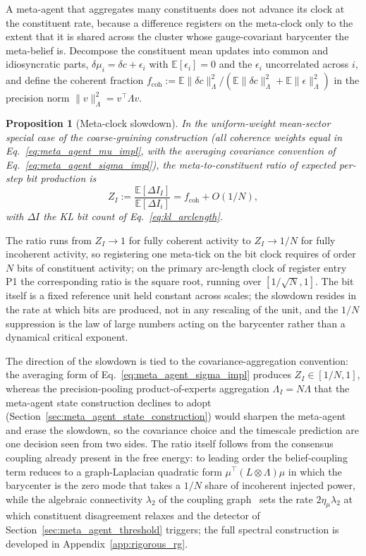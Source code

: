 \documentclass[11pt]{article}
\newtheorem{proposition}{Proposition}
\begin{document}
A meta-agent that aggregates many constituents does not advance its clock at the constituent rate, because a difference registers on the meta-clock only to the extent that it is shared across the cluster whose gauge-covariant barycenter the meta-belief is. Decompose the constituent mean updates into common and idiosyncratic parts, $\delta\mu_i = \delta c + \epsilon_i$ with $\mathbb{E}[\epsilon_i] = 0$ and the $\epsilon_i$ uncorrelated across $i$, and define the coherent fraction $f_{\mathrm{coh}} := \mathbb{E}\|\delta c\|^2_\Lambda / (\mathbb{E}\|\delta c\|^2_\Lambda + \mathbb{E}\|\epsilon\|^2_\Lambda)$ in the precision norm $\|v\|^2_\Lambda = v^\top \Lambda v$.
\begin{proposition}[Meta-clock slowdown]\label{prop:meta_clock_slowdown}
In the uniform-weight mean-sector special case of the coarse-graining construction (all coherence weights equal in Eq.~\eqref{eq:meta_agent_mu_impl}, with the averaging covariance convention of Eq.~\eqref{eq:meta_agent_sigma_impl}), the meta-to-constituent ratio of expected per-step bit production is
\begin{equation}
Z_I := \frac{\mathbb{E}[\Delta I_I]}{\mathbb{E}[\Delta I_i]} = f_{\mathrm{coh}} + O(1/N),
\label{eq:bit_production_ratio}
\end{equation}
with $\Delta I$ the KL bit count of Eq.~\eqref{eq:kl_arclength}.
\end{proposition}
The ratio runs from $Z_I \to 1$ for fully coherent activity to $Z_I \to 1/N$ for fully incoherent activity, so registering one meta-tick on the bit clock requires of order $N$ bits of constituent activity; on the primary arc-length clock of register entry P1 the corresponding ratio is the square root, running over $[1/\sqrt{N}, 1]$. The bit itself is a fixed reference unit held constant across scales; the slowdown resides in the rate at which bits are produced, not in any rescaling of the unit, and the $1/N$ suppression is the law of large numbers acting on the barycenter rather than a dynamical critical exponent.

The direction of the slowdown is tied to the covariance-aggregation convention: the averaging form of Eq.~\eqref{eq:meta_agent_sigma_impl} produces $Z_I \in [1/N, 1]$, whereas the precision-pooling product-of-experts aggregation $\Lambda_I = N\Lambda$ that the meta-agent state construction declines to adopt (Section~\ref{sec:meta_agent_state_construction}) would sharpen the meta-agent and erase the slowdown, so the covariance choice and the timescale prediction are one decision seen from two sides. The ratio itself follows from the consensus coupling already present in the free energy: to leading order the belief-coupling term reduces to a graph-Laplacian quadratic form $\mu^\top (L \otimes \Lambda)\mu$ in which the barycenter is the zero mode that takes a $1/N$ share of incoherent injected power, while the algebraic connectivity $\lambda_2$ of the coupling graph~\cite{Fiedler1973} sets the rate $2\eta_\mu\lambda_2$ at which constituent disagreement relaxes and the detector of Section~\ref{sec:meta_agent_threshold} triggers; the full spectral construction is developed in Appendix~\ref{app:rigorous_rg}.
\end{document}
